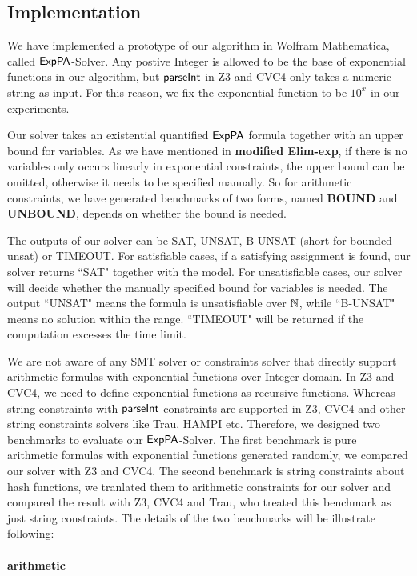 
\subsection{Implementation}
We have implemented a prototype of our algorithm in Wolfram Mathematica, called  ${\sf ExpPA}$-Solver. Any postive Integer is allowed to be the base of exponential functions in our algorithm, but $\textsf{parseInt}$ in Z3 and CVC4 only takes a numeric string as input. For this reason, we fix the exponential function to be $10^x$ in our experiments.

Our solver takes an existential quantified {${\sf ExpPA}$} formula together with an upper bound for variables. As we have mentioned in \textbf{modified Elim-exp}, if there is no variables only occurs linearly in exponential constraints, the upper bound can be omitted, otherwise it needs to be specified manually. So for arithmetic constraints, we have generated benchmarks of two forms, named \textbf{BOUND} and \textbf{UNBOUND}, depends on whether the bound is needed.

The outputs of our solver can be SAT, UNSAT, B-UNSAT (short for bounded unsat) or TIMEOUT. For satisfiable cases, if a satisfying assignment is found, our solver returns ``SAT" together with the model. For unsatisfiable cases, our solver will decide whether the manually specified bound for variables is needed. The output ``UNSAT" means the formula is unsatisfiable over $\mathbb{N}$, while ``B-UNSAT" means no solution within the range. ``TIMEOUT" will be returned if the computation excesses the time limit. 

We are not aware of any SMT solver or constraints solver that directly support arithmetic formulas with exponential functions over Integer domain. In Z3 and CVC4, we need to define exponential functions as recursive functions. Whereas string constraints with $\textsf{parseInt}$ constraints are supported in Z3, CVC4 and other string constraints solvers like Trau, HAMPI etc. Therefore, we designed two benchmarks to evaluate our ${\sf ExpPA}$-Solver. The first benchmark is pure arithmetic formulas with exponential functions generated randomly, we compared our solver with Z3 and CVC4. The second benchmark is string constraints about hash functions, we tranlated them to arithmetic constraints for our solver and compared the result with Z3, CVC4 and Trau, who treated this benchmark as just string constraints. The details of the two benchmarks will be illustrate following:

\paragraph{arithmetic}

